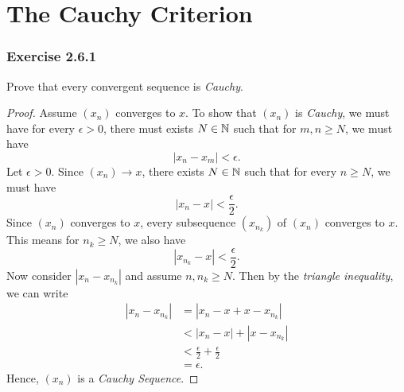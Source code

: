 \section{The Cauchy Criterion}

\subsubsection{Exercise 2.6.1}
Prove that every convergent sequence is \textit{Cauchy}.
\begin{proof}
Assume \( (x_n)\) converges to \(x\). To show that \((x_n)\) is \textit{Cauchy}, we must have for every \( \epsilon > 0 \),  there must exists \( N \in \mathbb{N} \) such that for \( m,n \geq N \), we must have 
\[ |x_n - x_m| < \epsilon. \]
Let \( \epsilon > 0 \). Since \( (x_n) \to x \), there exists \( N \in \mathbb{N} \) such that for every \( n \geq N \), we must have 
\[ |x_n - x| < \frac{\epsilon}{2}. \]
Since \( (x_n)\) converges to \(x\), every subsequence \( (x_{n_k})\) of \((x_n)\) converges to \(x \). This means for \( n_k \geq N \), we also have 
\[ | x_{n_k} - x | < \frac{ \epsilon }{2}.\] 
Now consider \(|x_n - x_{n_k}| \) and assume \( n, n_k \geq N \). Then by the \textit{triangle inequality}, we can write 
\begin{align*}
    |x_n - x_{n_k}| &= |x_n - x + x - x_{n_k} | \\
                    &< |x_n - x| + |x - x_{n_k}| \\
               &< \frac{\epsilon}{2} + \frac{\epsilon }{2} \\
               &= \epsilon.
\end{align*}
Hence, \((x_n)\) is a \textit{Cauchy Sequence}. 
\end{proof}

